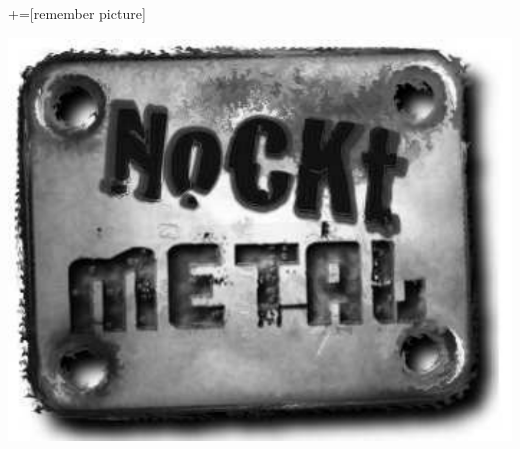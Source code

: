 \documentclass[9pt,xcolor=svgnames]{beamer}
\begin{document}
+=[remember picture]
\everymath{\displaystyle}

\begin{frame}

 \thispagestyle{empty}
 \begin{center}
  \includegraphics[scale=0.7]{Imagenes/logo.pdf}
 \end{center}
\end{frame}

\end{document}
